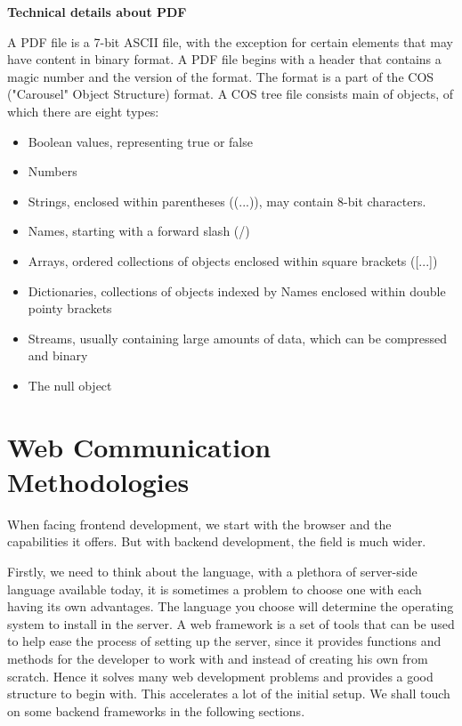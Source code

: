 \documentclass[paper.tex]{subfiles}
\begin{document}
\bigbreak
\textbf{Technical details about PDF}
\par
A PDF file is a 7-bit ASCII file, with the exception for certain elements that may have content in binary format. A PDF file begins with a header that contains a magic number and the version of the format. The format is a part of the COS ("Carousel" Object Structure) format. A COS tree file consists main of objects, of which there are eight types:

\begin{itemize}
  \item Boolean values, representing true or false
  \item Numbers
  \item Strings, enclosed within parentheses ((...)), may contain 8-bit characters.
  \item Names, starting with a forward slash (/)
  \item Arrays, ordered collections of objects enclosed within square brackets ([...])
  \item Dictionaries, collections of objects indexed by Names enclosed within double pointy brackets
  \item Streams, usually containing large amounts of data, which can be compressed and binary
  \item The null object
\end{itemize}

\section{Web Communication Methodologies}
\par
When facing frontend development, we start with the browser and the capabilities it offers. But with backend development, the field is much wider.

\par
Firstly, we need to think about the language, with a plethora of server-side language available today, it is sometimes a problem to choose one with each having its own advantages. The language you choose will determine the operating system to install in the server. A web framework is a set of tools that can be used to help ease the process of setting up the server, since it provides functions and methods for the developer to work with and instead of creating his own from scratch. Hence it solves many web development problems and provides a good structure to begin with. This accelerates a lot of the initial setup. We shall touch on some backend frameworks in the following sections.
\end{document}
